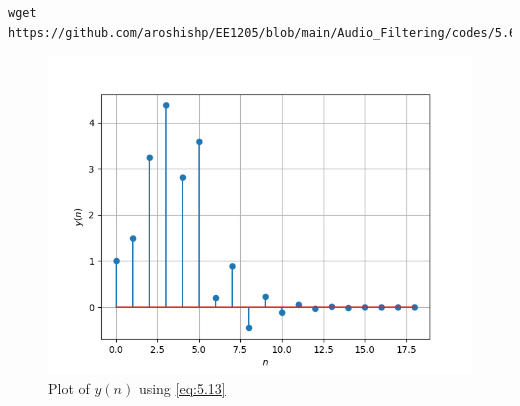\documentclass[journal,12pt,twocolumn]{IEEEtran}
\theoremstyle{remark}
\renewcommand\thesection{\arabic{section}}
\numberwithin{equation}{subsection}
\begin{document}
\begin{enumerate}[label=\thesection.\arabic*]
\begin{lstlisting}
wget https://github.com/aroshishp/EE1205/blob/main/Audio_Filtering/codes/5.6.py
\end{lstlisting}
\begin{figure}[!h]
    \centering
    \includegraphics[width = \columnwidth]{figs/5.6.png}
    \caption{Plot of $y(n)$ using \eqref{eq:5.13}}
    \label{fig:5.6}
\end{figure}
\end{enumerate}
\newpage
\end{document}
